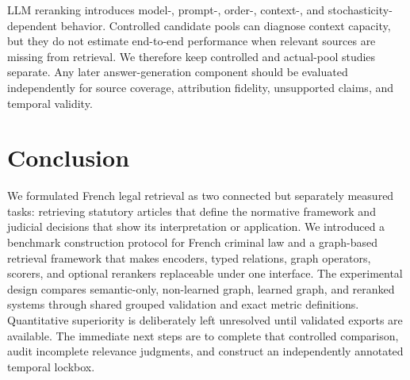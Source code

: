 \documentclass[runningheads]{llncs}
\begin{document}
LLM reranking introduces model-, prompt-, order-, context-, and stochasticity-dependent behavior. Controlled candidate pools can diagnose context capacity, but they do not estimate end-to-end performance when relevant sources are missing from retrieval. We therefore keep controlled and actual-pool studies separate. Any later answer-generation component should be evaluated independently for source coverage, attribution fidelity, unsupported claims, and temporal validity.

\section{Conclusion}

We formulated French legal retrieval as two connected but separately measured tasks: retrieving statutory articles that define the normative framework and judicial decisions that show its interpretation or application. We introduced a benchmark construction protocol for French criminal law and a graph-based retrieval framework that makes encoders, typed relations, graph operators, scorers, and optional rerankers replaceable under one interface. The experimental design compares semantic-only, non-learned graph, learned graph, and reranked systems through shared grouped validation and exact metric definitions. Quantitative superiority is deliberately left unresolved until validated exports are available. The immediate next steps are to complete that controlled comparison, audit incomplete relevance judgments, and construct an independently annotated temporal lockbox.



\end{document}
